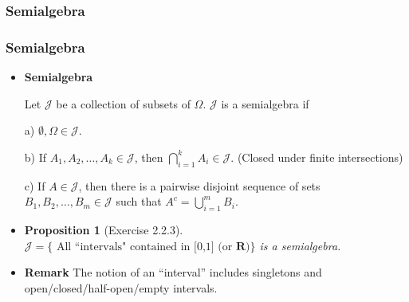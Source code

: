 \documentclass[%
]{beamer}
\newtheorem{Proposition}[theorem]{Proposition}%
\begin{document}
\subsubsection{Semialgebra}
\frame
{
  \frametitle{Semialgebra}

   \begin{itemize}

      
       \item<1->  \textbf{Semialgebra} 
       
       Let $\mathcal{J}$ be a collection of subsets of $\Omega$.  $\mathcal{J}$ is a semialgebra if 
       
       
       a) $\emptyset, \Omega \in \mathcal{J}$.
       
    
       b) If $A_1, A_2, \ldots, A_k \in \mathcal{J}$, then $\bigcap_{i=1}^k A_i \in \mathcal{J}$. (Closed under finite intersections) 
       

       c) If $A \in \mathcal{J}$, then there is a pairwise disjoint sequence of sets $B_1, B_2,\ldots, B_m \in \mathcal{J}$ such that $A^c=\bigcup_{i=1}^m B_i$. 
       
       \item<2-> [] \begin{Proposition}[Exercise 2.2.3] $\mathcal{J}=\{\text{ All ``intervals" contained in [0,1] (or } \mathbf{R})\}$  is a semialgebra.  \end{Proposition}
       
              \item<3-> \textbf{Remark} The notion of an ``interval'' includes singletons and open/closed/half-open/empty intervals. 
         
                 \end{itemize}
}
\end{document}
